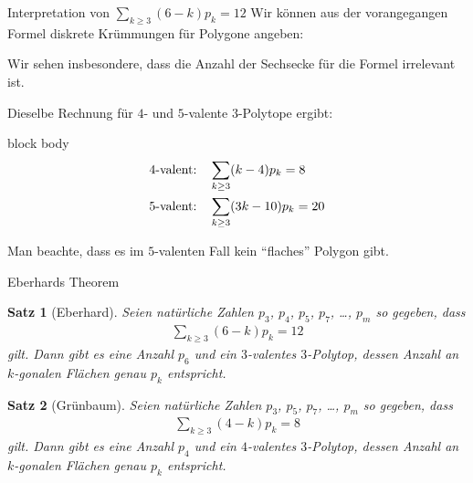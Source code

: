 \documentclass[10pt, notheorems]{beamer}
\newtheorem{theorem}{Satz}[section]
\begin{document}
\begin{frame}{Interpretation von $\sum_{k \geq 3} (6 - k) p_k = 12$}
  Wir können aus der vorangegangen Formel diskrete Krümmungen für Polygone angeben:

  \centering
  
  \pause
  \justifying
  Wir sehen insbesondere, dass die Anzahl der Sechsecke für die Formel irrelevant ist.
\end{frame}

\begin{frame}
  Dieselbe Rechnung für $4$- und $5$-valente $3$-Polytope ergibt:

  \medskip
  \begin{beamercolorbox}[sep=-10pt,center,shadow=true,rounded=true]{block body}
    \begin{align*}
      4\text{-valent:\quad}&\sum_{k \geq 3} (k-4)p_k = 8\\
      5\text{-valent:\quad}&\sum_{k \geq 3} (3k-10)p_k = 20
    \end{align*}
  \end{beamercolorbox}
  \medskip
  \pause
  Man beachte, dass es im $5$-valenten Fall kein ``flaches'' Polygon gibt.
\end{frame}

\begin{frame}{{\sc Eberhard}s Theorem}
  \begin{theorem}[\sc Eberhard]
    Seien natürliche Zahlen $p_3$, $p_4$, $p_5$, $p_7$, \dots, $p_m$ so gegeben, dass
    \begin{align*}
      \sum_{k \geq 3} (6 - k) p_k = 12
    \end{align*}
    gilt. Dann gibt es eine Anzahl $p_6$ und ein $3$-valentes $3$-Polytop, dessen Anzahl an $k$-gonalen Flächen genau $p_k$ entspricht.   
  \end{theorem}
  \pause
  \begin{theorem}[\sc Grünbaum]
    Seien natürliche Zahlen $p_3$, $p_5$, $p_7$, \dots, $p_m$ so gegeben, dass
    \begin{align*}
      \sum_{k \geq 3} (4 - k) p_k = 8
    \end{align*}
    gilt. Dann gibt es eine Anzahl $p_4$ und ein $4$-valentes $3$-Polytop, dessen Anzahl an $k$-gonalen Flächen genau $p_k$ entspricht.   
  \end{theorem}
\end{frame}
\end{document}
